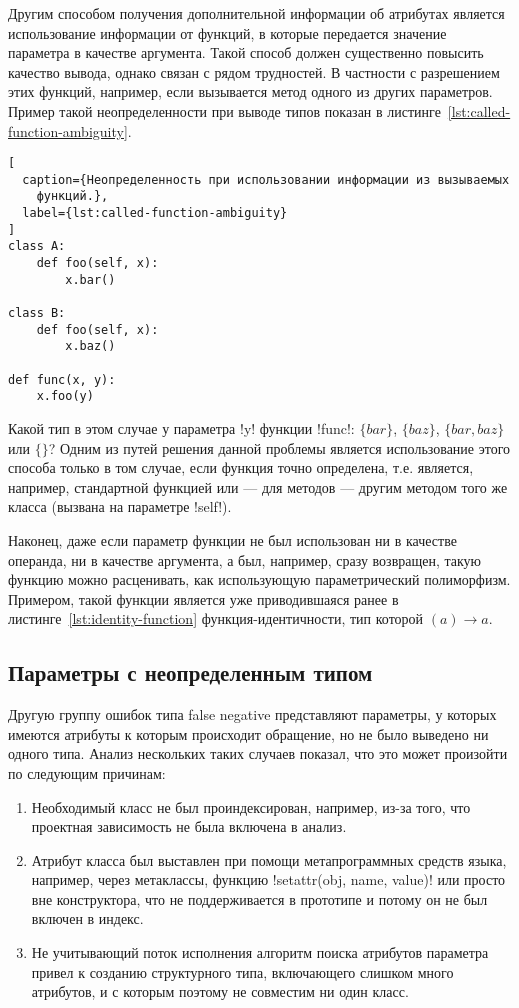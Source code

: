 Другим способом получения дополнительной информации об атрибутах является
использование информации от функций, в которые передается значение параметра в
качестве аргумента. Такой способ должен существенно повысить качество вывода,
однако связан с рядом трудностей. В частности с разрешением этих функций,
например, если вызывается метод одного из других параметров. Пример такой
неопределенности при выводе типов показан в
листинге~\ref{lst:called-function-ambiguity}.

\begin{lstlisting}[
  caption={Неопределенность при использовании информации из вызываемых
    функций.},
  label={lst:called-function-ambiguity}
]
class A:
    def foo(self, x):
        x.bar()

class B:
    def foo(self, x):
        x.baz()

def func(x, y):
    x.foo(y)
\end{lstlisting}

Какой тип в этом случае у параметра !y! функции !func!: $\{bar\}$, $\{baz\}$,
$\{bar, baz\}$ или $\{\}$? Одним из путей решения данной проблемы является
использование этого способа только в том случае, если функция точно определена,
т.е. является, например, стандартной функцией или --- для методов --- другим
методом того же класса (вызвана на параметре !self!).

Наконец, даже если параметр функции не был использован ни в качестве операнда,
ни в качестве аргумента, а был, например, сразу возвращен, такую функцию можно
расценивать, как использующую параметрический полиморфизм. Примером, такой
функции является уже приводившаяся ранее в листинге~\ref{lst:identity-function}
функция-идентичности, тип которой $(a) \rightarrow a$.

\subsection{Параметры с неопределенным типом}
\label{sub:undefined-type-parameters}

Другую группу ошибок типа false negative представляют параметры, у которых
имеются атрибуты к которым происходит обращение, но не было выведено ни одного
типа. Анализ нескольких таких случаев показал, что это может произойти по
следующим причинам:

\begin{enumerate}
    \item Необходимый класс не был проиндексирован, например, из-за того, что
      проектная зависимость не была включена в анализ.

    \item Атрибут класса был выставлен при помощи метапрограммных средств языка,
      например, через метаклассы, функцию !setattr(obj, name, value)! или просто
      вне конструктора, что не поддерживается в прототипе и потому он не был
      включен в индекс.

    \item Не учитывающий поток исполнения алгоритм поиска атрибутов параметра
      привел к созданию структурного типа, включающего слишком много
      атрибутов, и с которым поэтому не совместим ни один класс.

\end{enumerate}

